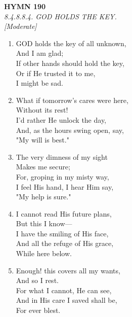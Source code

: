 \newpage
\begin{center}
    {\Large \textbf{HYMN 190}}
    \\
    \textit{8.4.8.8.4. GOD HOLDS THE KEY.}
    \\
    \textit{\small [Moderate]}
\end{center}
\vspace{1em}

\begin{enumerate}
    \item GOD holds the key of all unknown, \\
        And I am glad; \\
        If other hands should hold the key, \\
        Or if He trusted it to me, \\
        I might be sad.

    \item What if tomorrow's cares were here, \\
        Without its rest! \\
        I'd rather He unlock the day, \\
        And, as the hours swing open, say, \\
        "My will is best."

    \item The very dimness of my sight \\
        Makes me secure; \\
        For, groping in my misty way, \\
        I feel His hand, I hear Him say, \\
        "My help is sure."

    \item I cannot read His future plans, \\
        But this I know--- \\
        I have the smiling of His face, \\
        And all the refuge of His grace, \\
        While here below.

    \item Enough! this covers all my wants, \\
        And so I rest. \\
        For what I cannot, He can see, \\
        And in His care I saved shall be, \\
        For ever blest.

\end{enumerate}

